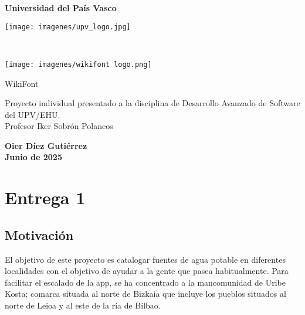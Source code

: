 \documentclass[11pt,a4paper]{article}
\begin{document}
\begin{titlepage}
 \vfill
  \begin{center}
   {\Huge\textbf{Universidad del País Vasco}} \\[1.5cm]
   
   \begin{minipage}[t]{0.5\textwidth}
   \centering
   \texttt{[image: imagenes/upv\_logo.jpg]}
   \end{minipage}
   \\ %
   \begin{minipage}[t]{0.5\textwidth}
   \centering
   \texttt{[image: imagenes/wikifont logo.png]}
   \end{minipage}
   
   \vfill

   {\huge WikiFont}\\[2.5cm]

   \hspace{.45\textwidth}
   \begin{minipage}{.5\textwidth}
   \large Proyecto individual presentado a la disciplina de Desarrollo Avanzado de Software del UPV/EHU.\\[1cm]

Profesor Iker Sobrón Polancos

  \end{minipage}
  \vfill

\vspace{2cm}

\large \textbf{Oier Díez Gutiérrez}\\

\large \textbf{Junio de 2025}
\end{center}
\end{titlepage}


\tableofcontents{}
\newpage

\section{Entrega 1}
\subsection{Motivación}
El objetivo de este proyecto es catalogar fuentes de agua potable en diferentes localidades con el objetivo de ayudar a la gente que pasea habitualmente. Para facilitar el escalado de la app, se ha concentrado a la mancomunidad de Uribe Kosta; comarca situada al norte de Bizkaia que incluye los pueblos situados al norte de Leioa y al este de la ría de Bilbao.
\end{document}
